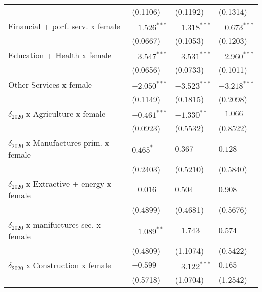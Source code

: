 \begin{table}[h!]
{{\begin{tabular}{llll}
                                                   &           (0.1106) &           (0.1192) &           (0.1314) \\
Financial + porf. serv. x female                   &     $-1.526^{***}$ &     $-1.318^{***}$ &     $-0.673^{***}$ \\
                                                   &           (0.0667) &           (0.1053) &           (0.1203) \\
Education + Health x female                        &     $-3.547^{***}$ &     $-3.531^{***}$ &     $-2.960^{***}$ \\
                                                   &           (0.0656) &           (0.0733) &           (0.1011) \\
Other Services x female                            &     $-2.050^{***}$ &     $-3.523^{***}$ &     $-3.218^{***}$ \\
                                                   &           (0.1149) &           (0.1815) &           (0.2098) \\
$\delta_{2020}$ x Agriculture x female             &     $-0.461^{***}$ &      $-1.330^{**}$ &           $-1.066$ \\
                                                   &           (0.0923) &           (0.5532) &           (0.8522) \\
$\delta_{2020}$ x Manufactures prim. x female      &          $0.465^*$ &            $0.367$ &            $0.128$ \\
                                                   &           (0.2403) &           (0.5210) &           (0.5840) \\
$\delta_{2020}$ x Extractive + energy x female     &           $-0.016$ &            $0.504$ &            $0.908$ \\
                                                   &           (0.4899) &           (0.4681) &           (0.5676) \\
$\delta_{2020}$ x manifuctures sec. x female       &      $-1.089^{**}$ &           $-1.743$ &            $0.574$ \\
                                                   &           (0.4809) &           (1.1074) &           (0.5422) \\
$\delta_{2020}$ x Construction x female            &           $-0.599$ &     $-3.122^{***}$ &            $0.165$ \\
                                                   &           (0.5718) &           (1.0704) &           (1.2542) \\

\end{tabular}}}
\end{table}
